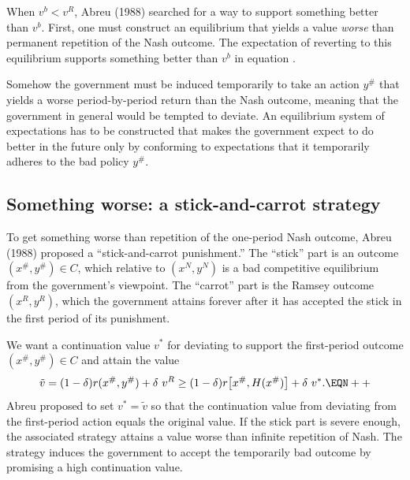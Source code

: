 

When $v^b < v^R$,
Abreu (1988) searched for a way to support something
better than $v^b$.
First, one must  construct an equilibrium that yields a
value {\it worse\/} than permanent repetition of the Nash outcome.
The expectation of reverting to this equilibrium
supports  something better
than $v^b$ in equation .

Somehow the government must be induced temporarily to
take an action $y^\#$ that yields a worse period-by-period
return than
the Nash outcome, meaning that the government in general
would be tempted to deviate.
An equilibrium system of expectations
has to be constructed that makes the government expect to do
better in the future only by conforming to expectations that it
temporarily adheres to the bad policy $y^\#$.

\subsection{Something worse: a stick-and-carrot strategy}
To get something worse than repetition of the one-period Nash outcome,
Abreu (1988) proposed a ``stick-and-carrot punishment.''
The ``stick'' part is an outcome $(x^\#,y^\#)\in C$, which
relative to $(x^N, y^N)$
is a bad competitive equilibrium from the government's viewpoint.  The
``carrot'' part is the Ramsey outcome $(x^R,y^R)$, which the
government attains forever after it has accepted the stick in the
first period of its punishment.   

\newpage

 We want
a continuation value $v^*$ for deviating to support the first-period
 outcome $(x^\#, y^\#)\in C$ and attain the value
$$\tilde v = (1-\delta) r(x^\#, y^\#) + \delta\ v^R
\geq (1-\delta) r\bigl[ x^\#, H(x^\#)\bigr] + \delta \ v^* . \EQN ++ $$
Abreu proposed to set $v^* = \tilde v$ so that the
continuation value from deviating from the first-period
action equals the original value.  If the stick part is severe
enough, the associated strategy
attains a
value worse than infinite repetition of Nash.
The strategy induces the government to accept
the temporarily bad
outcome by promising a high continuation value.

